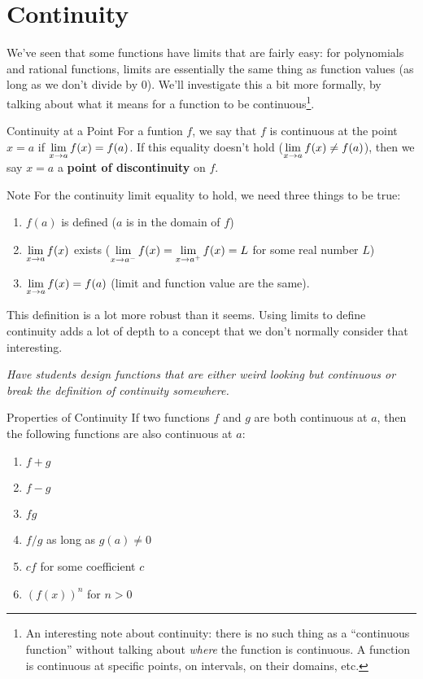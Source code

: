 \section{Continuity}

We've seen that some functions have limits that are fairly easy: for polynomials and rational functions, limits are essentially the same thing as function values (as long as we don't divide by 0).
We'll investigate this a bit more formally, by talking about what it means for a function to be continuous\footnote{An interesting note about continuity: there is no such thing as a ``continuous function'' without talking about \textit{where} the function is continuous. A function is continuous at specific points, on intervals, on their domains, etc.}.

\begin{defn}{Continuity at a Point}
  For a funtion $f$, we say that $f$ is continuous at the point $x=a$ if $\displaystyle \lim_{x\to a} f(x) = f(a)$.
  If this equality doesn't hold ($\displaystyle \lim_{x\to a} f(x) \neq f(a)$), then we say $x=a$ a \textbf{point of discontinuity} on $f$.
\end{defn}

\begin{note}{Note}
  For the continuity limit equality to hold, we need three things to be true:
  \begin{enumerate}
    \item $f(a)$ is defined ($a$ is in the domain of $f$)
    \item $\displaystyle \lim_{x\to a}f(x)$ exists ($\displaystyle \lim_{x\to a^-} f(x) = \displaystyle \lim_{x\to a^+} f(x) = L$ for some real number $L$)
    \item $\displaystyle \lim_{x\to a}f(x) = f(a)$ (limit and function value are the same).
  \end{enumerate}
\end{note}

This definition is a lot more robust than it seems.
Using limits to define continuity adds a lot of depth to a concept that we don't normally consider that interesting.

\textit{Have students design functions that are either weird looking but continuous or break the definition of continuity somewhere.}

\begin{thm}{Properties of Continuity}
  If two functions $f$ and $g$ are both continuous at $a$, then the following functions are also continuous at $a$:
    \begin{enumerate}
      \item $f+g$
      \item $f-g$
      \item $fg$
      \item $f/g$ as long as $g(a)\neq 0$
      \item $cf$ for some coefficient $c$
      \item $(f(x))^n$ for $n>0$
    \end{enumerate}
\end{thm}

